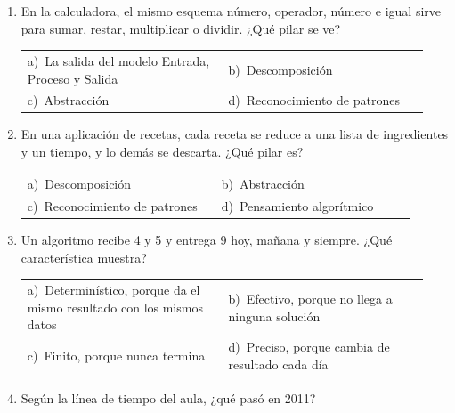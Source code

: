 \documentclass[11pt,a4paper]{article}
\begin{document}
\begin{enumerate}[label=\textbf{\arabic*.},leftmargin=*,itemsep=6pt,topsep=0pt]
\item \begin{minipage}[t]{\linewidth}
En la calculadora, el mismo esquema número, operador, número e igual sirve para sumar, restar, multiplicar o dividir. ¿Qué pilar se ve?

\vspace{4pt}
\begin{tabular}{@{}>{\raggedright\arraybackslash}p{0.47\linewidth}>{\raggedright\arraybackslash}p{0.47\linewidth}@{}}
a)~La salida del modelo Entrada, Proceso y Salida & b)~Descomposición \\
c)~Abstracción & d)~Reconocimiento de patrones \\
\end{tabular}
\end{minipage}

\item \begin{minipage}[t]{\linewidth}
En una aplicación de recetas, cada receta se reduce a una lista de ingredientes y un tiempo, y lo demás se descarta. ¿Qué pilar es?

\vspace{4pt}
\begin{tabular}{@{}>{\raggedright\arraybackslash}p{0.47\linewidth}>{\raggedright\arraybackslash}p{0.47\linewidth}@{}}
a)~Descomposición & b)~Abstracción \\
c)~Reconocimiento de patrones & d)~Pensamiento algorítmico \\
\end{tabular}
\end{minipage}

\item \begin{minipage}[t]{\linewidth}
Un algoritmo recibe 4 y 5 y entrega 9 hoy, mañana y siempre. ¿Qué característica muestra?

\vspace{4pt}
\begin{tabular}{@{}>{\raggedright\arraybackslash}p{0.47\linewidth}>{\raggedright\arraybackslash}p{0.47\linewidth}@{}}
a)~Determinístico, porque da el mismo resultado con los mismos datos & b)~Efectivo, porque no llega a ninguna solución \\
c)~Finito, porque nunca termina & d)~Preciso, porque cambia de resultado cada día \\
\end{tabular}
\end{minipage}

\item \begin{minipage}[t]{\linewidth}
Según la línea de tiempo del aula, ¿qué pasó en 2011?


\end{minipage}
\end{enumerate}
\end{document}
